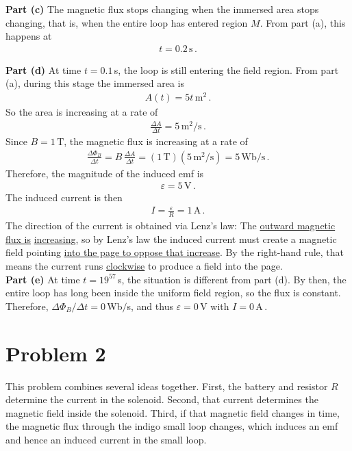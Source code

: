 \documentclass[11pt]{article}
\begin{document}
\noindent\textbf{Part (c)} The magnetic flux stops changing when the immersed area stops changing, that is, when the entire loop has entered region $M$. From part (a), this happens at
\begin{align*}
t = 0.2\,\text{s}\,.
\end{align*}

\noindent\textbf{Part (d)} At time $t=0.1\,$s, the loop is still entering the field region. From part (a), during this stage the immersed area is
\begin{align*}
A(t)=5t\,\text{m}^2\,.
\end{align*}
So the area is increasing at a rate of
\begin{align*}
\frac{\Delta A}{\Delta t}=5\,\text{m}^2/\text{s}\,.
\end{align*}
Since $B=1\,\text{T}$, the magnetic flux is increasing at a rate of
\begin{align*}
\frac{\Delta \Phi_B}{\Delta t}=B\,\frac{\Delta A}{\Delta t}=(1\,\text{T})(5\,\text{m}^2/\text{s})=5\,\text{Wb/s}\,.
\end{align*}
Therefore, the magnitude of the induced emf is
\begin{align*}
\varepsilon = 5\,\text{V}\,.
\end{align*}
The induced current is then
\begin{align*}
I = \frac{\varepsilon}{R} = 1\,\text{A}\,.
\end{align*}
The direction of the current is obtained via Lenz's law: The \underline{outward magnetic flux is} \underline{increasing}, so by Lenz's law the induced current must create a magnetic field pointing \underline{into the page to oppose that increase}. By the right-hand rule, that means the current runs \underline{clockwise} to produce a field into the page.\\

\noindent\textbf{Part (e)} At time $t=19^{57}\,$s, the situation is different from part (d). By then, the entire loop has long been inside the uniform field region, so the flux is constant. Therefore, $\Delta \Phi_{B}/\Delta t = 0\,$Wb$/$s, and thus $\varepsilon = 0\,\text{V}$ with $I=0\,\text{A}$\,.

\section*{Problem 2}
This problem combines several ideas together. First, the battery and resistor $R$ determine the current in the solenoid. Second, that current determines the magnetic field inside the solenoid. Third, if that magnetic field changes in time, the magnetic flux through the indigo small loop changes, which induces an emf and hence an induced current in the small loop.\\
\end{document}
